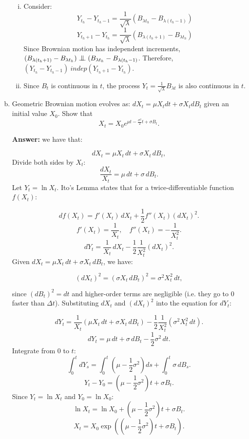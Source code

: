 \documentclass[11pt]{extarticle}
\newcommand{\indep}{\mathrel{\text{\scalebox{1.07}{$\perp\mkern-10mu\perp$}}}}
\theoremstyle{plain}
\theoremstyle{definition}
\begin{document}
\begin{enumerate}[(a)]
\begin{enumerate}[(i)]
    \item Consider:
    \[
    Y_{t_h} - Y_{t_h-1} = \frac{1}{\sqrt{\lambda}} ( B_{\lambda t_h} - B_{\lambda (t_h - 1)} )
    \]
    \[
    Y_{t_h+1} - Y_{t_h} = \frac{1}{\sqrt{\lambda}} ( B_{\lambda (t_h + 1)} - B_{\lambda t_h} )
    \]
    Since Brownian motion has independent increments, $ ( B_{\lambda (t_h + 1)} - B_{\lambda t_h} ) \indep ( B_{\lambda t_h} - B_{\lambda (t_h - 1)}$. Therefore, $(Y_{t_h} - Y_{t_h-1}) \ indep (Y_{t_h+1} - Y_{t_h})$.
    
    \item Since \( B_t \) is continuous in \( t \), the process \( Y_t = \frac{1}{\sqrt{\lambda}} B_{\lambda t} \) is also continuous in \( t \).
\end{enumerate}

\item Geometric Brownian motion evolves as: $dX_t = \mu X_t dt + \sigma X_t dB_t$ given an initial value $X_0$. Show that
\begin{equation*}
	X_t = X_0 e^{\mu t - \frac{\sigma^2}{2} t + \sigma B_t}.
\end{equation*}

\textbf{Answer:} we have that:

\[
dX_t = \mu X_t\,dt + \sigma X_t\,dB_t,
\]
Divide both sides by \( X_t \):
\[
\frac{dX_t}{X_t} = \mu\,dt + \sigma\,dB_t.
\]
Let \( Y_t = \ln X_t \). Ito's Lemma states that for a twice-differentiable function \( f(X_t) \):

\[
df(X_t) = f'(X_t)\,dX_t + \frac{1}{2}f''(X_t)(dX_t)^2.
\]
\[
f'(X_t) = \frac{1}{X_t}, \quad f''(X_t) = -\frac{1}{X_t^2}.
\]
\[
dY_t = \frac{1}{X_t}\,dX_t - \frac{1}{2}\frac{1}{X_t^2}(dX_t)^2.
\]
Given \( dX_t = \mu X_t\,dt + \sigma X_t\,dB_t \), we have:

\[
(dX_t)^2 = (\sigma X_t\,dB_t)^2 = \sigma^2 X_t^2\,dt,
\]

since \( (dB_t)^2 = dt \) and higher-order terms are negligible (i.e. they go to 0 faster than $\Delta t$). Substituting \( dX_t \) and \( (dX_t)^2 \) into the equation for \( dY_t \):

\[
dY_t = \frac{1}{X_t}(\mu X_t\,dt + \sigma X_t\,dB_t) - \frac{1}{2}\frac{1}{X_t^2}(\sigma^2 X_t^2\,dt).
\]
\[
dY_t = \mu\,dt + \sigma\,dB_t - \frac{1}{2}\sigma^2\,dt.
\]
Integrate from 0 to \( t \):
\[
\int_{0}^{t} dY_s = \int_{0}^{t} \left( \mu - \frac{1}{2}\sigma^2 \right) ds + \int_{0}^{t} \sigma\,dB_s.
\]
\[
Y_t - Y_0 = \left( \mu - \frac{1}{2}\sigma^2 \right)t + \sigma B_t.
\]
Since \( Y_t = \ln X_t \) and \( Y_0 = \ln X_0 \):
\[
\ln X_t = \ln X_0 + \left( \mu - \frac{1}{2}\sigma^2 \right)t + \sigma B_t.
\]
\[
X_t = X_0 \exp\left( \left( \mu - \frac{1}{2}\sigma^2 \right)t + \sigma B_t \right).
\]



\end{enumerate}
\end{document}
